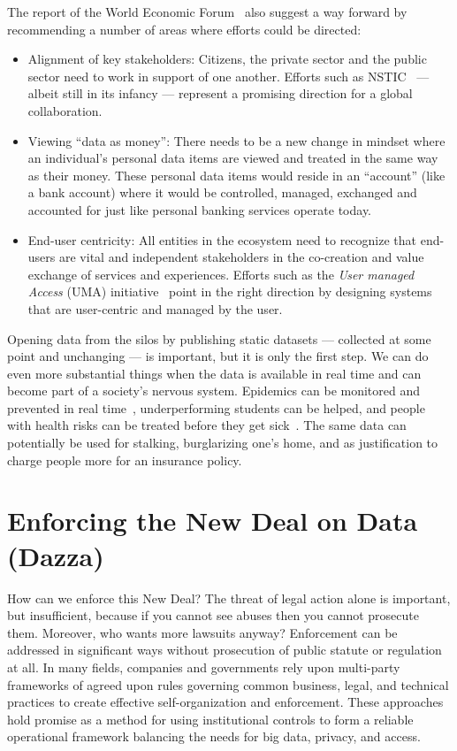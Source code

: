 The report of the World Economic Forum~\cite{WEF2011} also suggest a way forward by recommending
a number of areas where efforts could be directed:
\begin{itemize}
\item Alignment of key stakeholders:  
Citizens, the private sector and the public sector
need to work in support of one another.
Efforts such as NSTIC~\cite{NSTIC2011} --- albeit still in its infancy ---
represent a promising direction
for a global collaboration.


\item Viewing ``data as money'':
There needs to be a new change in mindset where
an individual's personal data items are viewed
and treated in the same way as their money.
These personal data items would reside in an ``account'' (like a bank account)
 where it would be controlled, managed, exchanged and 
accounted for just like personal banking services operate today.


\item End-user centricity:  All entities in the ecosystem need to
recognize that end-users are vital and 
independent stakeholders in the co-creation 
and value exchange of services and experiences.
Efforts such as the {\em User managed Access} (UMA) initiative~\cite{UMAcore}
point in the right direction by designing systems that are
user-centric and managed by the user.


\end{itemize}

Opening data from the silos by publishing static datasets --- collected at some point and unchanging --- is important, but it is only the first step.
We can do even more substantial things when the data is available in real time and can become part of a society's nervous system.
Epidemics can be monitored and prevented in real time~\cite{pentland2009using}, underperforming students can be helped, and people with health risks can be treated before they get sick~\cite{tacconi2008activity}. The same data can potentially be used for stalking, burglarizing one's home, and as justification to charge people more for an insurance policy.

\section{Enforcing the New Deal on Data (Dazza)}

How can we enforce this New Deal?
The threat of legal action alone is important, but insufficient, because if you cannot see abuses then you cannot prosecute them.
Moreover, who wants more lawsuits anyway?
Enforcement can be addressed in significant ways without prosecution of public statute or regulation at all.
In many fields, companies and governments rely upon multi-party frameworks of agreed upon rules governing common business, legal, and technical practices to create effective self-organization and enforcement.
These approaches hold promise as a method for using institutional controls to form a reliable operational framework balancing the needs for big data, privacy, and access.

